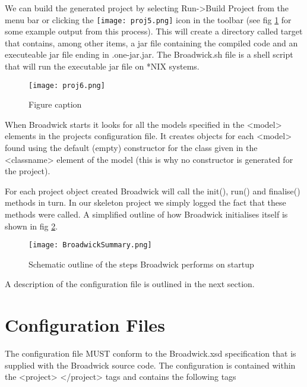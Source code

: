 We can build the generated project by selecting Run->Build Project from the menu bar or clicking the \texttt{[image: proj5.png]} icon in the toolbar (see fig \ref{proj6} for some example output from this process). This will create a directory called target that contains, among other items, a jar file containing the compiled code and an executeable jar file ending in .one-jar.jar. The Broadwick.sh file is a shell script that will run the executable jar file on *NIX systems.

\begin{figure}[h!]
\centering\texttt{[image: proj6.png]}
\caption{Figure caption}
\label{proj6}
\end{figure}

When Broadwick starts it looks for all the models specified in the <model> elements in the projects configuration file. It creates objects for each <model> found using the default (empty) constructor for the class given in the <classname> element of the model (this is why no constructor is generated for the project).

For each project object created Broadwick will call the init(), run() and finalise() methods in turn. In our skeleton project we simply logged the fact that these methods were called. A simplified outline of how Broadwick initialises itself is shown in fig \ref{broadwicksummary}.

\begin{figure}[h!]
\centering\texttt{[image: BroadwickSummary.png]}
\caption{Schematic outline of the steps Broadwick performs on startup}
\label{broadwicksummary}
\end{figure}

A description of the configuration file is outlined in the next section.

\section{Configuration Files}

The configuration file MUST conform to the Broadwick.xsd specification that is supplied with the Broadwick source code. The configuration is contained within the <project> </project> tags and contains the following tags

